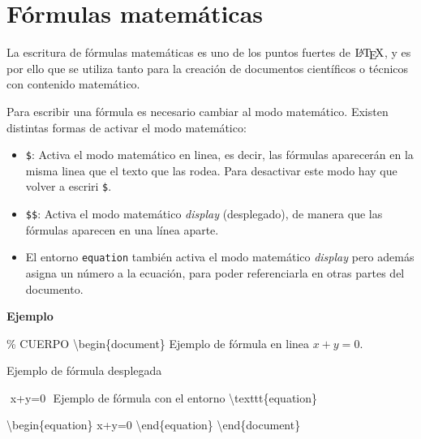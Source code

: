 \documentclass[
  a4paper,
]{scrreport}
\newenvironment{Shaded}{\begin{snugshade}}{\end{snugshade}}
\newcommand{\CommentTok}[1]{\textcolor[rgb]{0.37,0.37,0.37}{#1}}
\newcommand{\ExtensionTok}[1]{\textcolor[rgb]{0.00,0.23,0.31}{#1}}
\newcommand{\FunctionTok}[1]{\textcolor[rgb]{0.28,0.35,0.67}{#1}}
\newcommand{\KeywordTok}[1]{\textcolor[rgb]{0.00,0.23,0.31}{#1}}
\newcommand{\NormalTok}[1]{\textcolor[rgb]{0.00,0.23,0.31}{#1}}
\newcommand{\SpecialStringTok}[1]{\textcolor[rgb]{0.13,0.47,0.30}{#1}}
\begin{document}

\hypertarget{fuxf3rmulas-matemuxe1ticas}{%
\chapter{Fórmulas matemáticas}\label{fuxf3rmulas-matemuxe1ticas}}

La escritura de fórmulas matemáticas es uno de los puntos fuertes de
\(\text{\LaTeX}\), y es por ello que se utiliza tanto para la creación
de documentos científicos o técnicos con contenido matemático.

Para escribir una fórmula es necesario cambiar al modo matemático.
Existen distintas formas de activar el modo matemático:

\begin{itemize}
\item
  \texttt{\$}: Activa el modo matemático en linea, es decir, las
  fórmulas aparecerán en la misma linea que el texto que las rodea. Para
  desactivar este modo hay que volver a escriri \texttt{\$}.
\item
  \texttt{\$\$}: Activa el modo matemático \emph{display} (desplegado),
  de manera que las fórmulas aparecen en una línea aparte.
\item
  El entorno \texttt{equation} también activa el modo matemático
  \emph{display} pero además asigna un número a la ecuación, para poder
  referenciarla en otras partes del documento.
\end{itemize}

\textbf{Ejemplo}

\begin{Shaded}
\begin{Highlighting}[]
\CommentTok{\% CUERPO}
\KeywordTok{\textbackslash{}begin}\NormalTok{\{}\ExtensionTok{document}\NormalTok{\}}
\NormalTok{Ejemplo de fórmula en linea }\SpecialStringTok{$ x+y=0 $}\NormalTok{.}

\NormalTok{Ejemplo de fórmula desplegada}

\SpecialStringTok{$$ }
\SpecialStringTok{x+y=0}
\SpecialStringTok{$$}
\NormalTok{Ejemplo de fórmula con el entorno }\FunctionTok{\textbackslash{}texttt}\NormalTok{\{equation\}}

\KeywordTok{\textbackslash{}begin}\NormalTok{\{}\ExtensionTok{equation}\NormalTok{\}}
\SpecialStringTok{x+y=0}
\KeywordTok{\textbackslash{}end}\NormalTok{\{}\ExtensionTok{equation}\NormalTok{\}}
\KeywordTok{\textbackslash{}end}\NormalTok{\{}\ExtensionTok{document}\NormalTok{\}}
\end{Highlighting}
\end{Shaded}
\end{document}
